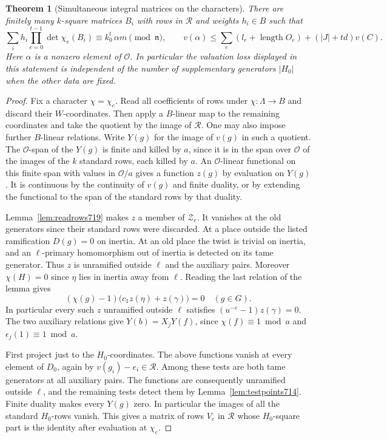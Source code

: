 \documentclass[a4paper,11pt]{article}
\newtheorem{theorem}[proposition]{Theorem}
\theoremstyle{definition}
\theoremstyle{remark}
\newcommand{\len}{\operatorname{length}}\newcommand{\Res}{\operatorname*{Res}}
\numberwithin{equation}{section}
\begin{document}
\begin{theorem}[Simultaneous integral matrices on the characters]
\leavevmode\label{thm:charrows719}
There are finitely many \(k\)-square matrices \(B_i\) with rows
in \(\mathcal R\) and weights \(h_i\in B\) such that
\[
       \sum_i h_i\prod_{e=0}^{t-1}\det\chi_e(B_i)
           \equiv k_0^t\,\alpha m\pmod{\mathfrak n},
       \qquad
       v(\alpha)\le
          \sum_e(l_e+\len O_e)+(|J|+td)v(C).
\]
Here \(\alpha\) is a nonzero element of \(\mathcal O\).
In particular the valuation loss displayed in this statement
is independent of the number of supplementary generators
\(|H_0|\) when the other data are fixed.
\end{theorem}
\begin{proof}
Fix a character \(\chi=\chi_e\). Read all coefficients of rows
under \(\chi:\Lambda\to B\) and discard their \(W\)-coordinates.
Then apply a \(B\)-linear map to the remaining coordinates and
take the quotient by the image of \(\mathcal R\). One may also
impose further \(B\)-linear relations. Write \(Y(g)\) for the
image of \(v(g)\) in such a quotient. The \(\mathcal O\)-span
of the \(Y(g)\) is finite and killed by \(a\), since it is in
the span over \(\mathcal O\) of the images of the \(k\) standard
rows, each killed by \(a\). An \(\mathcal O\)-linear functional
on this finite span with values in \(\mathcal O/a\) gives a
function \(z(g)\) by evaluation on \(Y(g)\). It is continuous
by the continuity of \(v(g)\) and finite duality, or by extending
the functional to the span of the standard rows by that duality.

Lemma~\ref{lem:readrows719} makes \(z\) a member of \(\mathcal Z_e\).
It vanishes at the old generators since their standard rows
were discarded. At a place outside the listed ramification
\(D(g)=0\) on inertia. At an old place the twist is trivial
on inertia, and an \(\ell\)-primary homomorphism out of inertia
is detected on its tame generator. Thus \(z\) is unramified
outside \(\ell\) and the auxiliary pairs. Moreover \(\chi(H)=0\)
since \(\eta\) lies in inertia away from \(\ell\). Reading the
last relation of the lemma gives
\[
           (\chi(g)-1)\bigl(c_1z(\eta)+z(\gamma)\bigr)=0
                        \quad(g\in G).
\]
In particular every such \(z\) unramified outside \(\ell\)
satisfies \((u^{-e}-1)z(\gamma)=0\). The two auxiliary relations
give \(Y(b)=X_jY(f)\), since \(\chi(f)\equiv1\bmod a\) and
\(\epsilon_j(1)\equiv1\bmod a\).

First project just to the \(H_0\)-coordinates. The above
functions vanish at every element of \(D_0\), again by
\(v(g_i)-e_i\in\mathcal R\). Among these tests are both tame
generators at all auxiliary pairs. The functions are consequently
unramified outside \(\ell\), and the remaining tests detect them
by Lemma~\ref{lem:testpoints714}. Finite duality makes every
\(Y(g)\) zero. In particular the images of all the standard
\(H_0\)-rows vanish. This gives a matrix of rows \(V_e\) in
\(\mathcal R\) whose \(H_0\)-square part is the identity after
evaluation at \(\chi_e\).


\end{proof}
\end{document}
